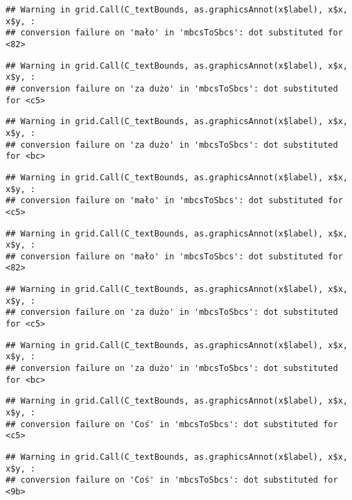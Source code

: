 \documentclass[
]{book}
\begin{document}
\begin{verbatim}
## Warning in grid.Call(C_textBounds, as.graphicsAnnot(x$label), x$x, x$y, :
## conversion failure on 'mało' in 'mbcsToSbcs': dot substituted for <82>
\end{verbatim}

\begin{verbatim}
## Warning in grid.Call(C_textBounds, as.graphicsAnnot(x$label), x$x, x$y, :
## conversion failure on 'za dużo' in 'mbcsToSbcs': dot substituted for <c5>
\end{verbatim}

\begin{verbatim}
## Warning in grid.Call(C_textBounds, as.graphicsAnnot(x$label), x$x, x$y, :
## conversion failure on 'za dużo' in 'mbcsToSbcs': dot substituted for <bc>
\end{verbatim}

\begin{verbatim}
## Warning in grid.Call(C_textBounds, as.graphicsAnnot(x$label), x$x, x$y, :
## conversion failure on 'mało' in 'mbcsToSbcs': dot substituted for <c5>
\end{verbatim}

\begin{verbatim}
## Warning in grid.Call(C_textBounds, as.graphicsAnnot(x$label), x$x, x$y, :
## conversion failure on 'mało' in 'mbcsToSbcs': dot substituted for <82>
\end{verbatim}

\begin{verbatim}
## Warning in grid.Call(C_textBounds, as.graphicsAnnot(x$label), x$x, x$y, :
## conversion failure on 'za dużo' in 'mbcsToSbcs': dot substituted for <c5>
\end{verbatim}

\begin{verbatim}
## Warning in grid.Call(C_textBounds, as.graphicsAnnot(x$label), x$x, x$y, :
## conversion failure on 'za dużo' in 'mbcsToSbcs': dot substituted for <bc>
\end{verbatim}

\begin{verbatim}
## Warning in grid.Call(C_textBounds, as.graphicsAnnot(x$label), x$x, x$y, :
## conversion failure on 'Coś' in 'mbcsToSbcs': dot substituted for <c5>
\end{verbatim}

\begin{verbatim}
## Warning in grid.Call(C_textBounds, as.graphicsAnnot(x$label), x$x, x$y, :
## conversion failure on 'Coś' in 'mbcsToSbcs': dot substituted for <9b>
\end{verbatim}
\end{document}
